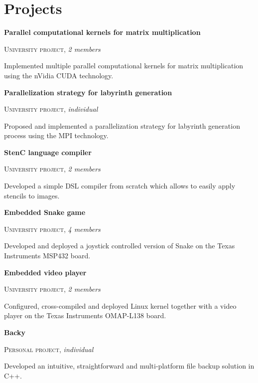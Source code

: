 \documentclass[a4paper, 11pt]{article}
\begin{document}
\section*{Projects}
\label{sec:org1ac0fff}

\textbf{Parallel computational kernels for matrix multiplication}

\textsc{University project}, \emph{2 members}

Implemented multiple parallel computational kernels for matrix multiplication
using the nVidia CUDA technology.

\vspace{1em}

\textbf{Parallelization strategy for labyrinth generation}

\textsc{University project}, \emph{individual}

Proposed and implemented a parallelization strategy for labyrinth generation
process using the MPI technology.

\vspace{1em}

\textbf{StenC language compiler}

\textsc{University project}, \emph{2 members}

Developed a simple DSL compiler from scratch which allows to easily apply
stencils to images.

\vspace{1em}

\textbf{Embedded Snake game}

\textsc{University project}, \emph{4 members}

Developed and deployed a joystick controlled version of Snake on the Texas
Instruments MSP432 board.

\vspace{1em}

\textbf{Embedded video player}

\textsc{University project}, \emph{2 members}

Configured, cross-compiled and deployed Linux kernel together with a video
player on the Texas Instruments OMAP-L138 board.

\vspace{1em}

\textbf{Backy}

\textsc{Personal project}, \emph{individual}

Developed an intuitive, straightforward and multi-platform file backup solution
in C++.

\vspace{1em}
\end{document}
